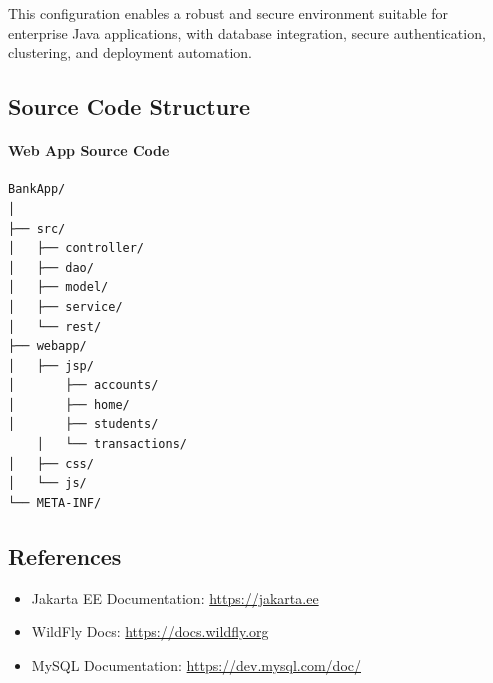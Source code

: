 \documentclass[12pt]{article}
\begin{document}
This configuration enables a robust and secure environment suitable for enterprise Java applications, with database integration, secure authentication, clustering, and deployment automation.

\subsection{Source Code Structure}
\paragraph{Web App Source Code}
\begin{verbatim}
BankApp/
│
├── src/
│   ├── controller/
│   ├── dao/
│   ├── model/
│   ├── service/
│   └── rest/
├── webapp/
│   ├── jsp/
│       ├── accounts/
│       ├── home/
│       ├── students/
    │   └── transactions/
│   ├── css/
│   └── js/
└── META-INF/
\end{verbatim}

\subsection{References}
\begin{itemize}
	\item Jakarta EE Documentation: \url{https://jakarta.ee}
	\item WildFly Docs: \url{https://docs.wildfly.org}
	\item MySQL Documentation: \url{https://dev.mysql.com/doc/}
\end{itemize}
\end{document}
